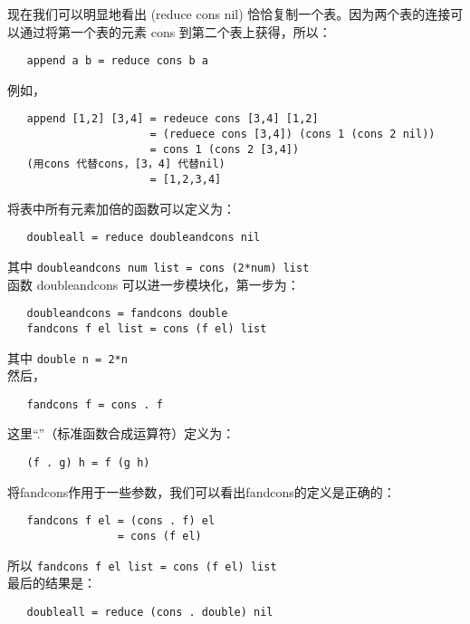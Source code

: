 \documentclass[12pt]{article}
\begin{document}
现在我们可以明显地看出 (reduce cons nil) 恰恰复制一个表。因为两个表的连接可以通过将第一个表的元素 cons 到第二个表上获得，所以：

\begin{verbatim}
   append a b = reduce cons b a
\end{verbatim}

例如，
\begin{verbatim}
   append [1,2] [3,4] = redeuce cons [3,4] [1,2]
                      = (reduece cons [3,4]) (cons 1 (cons 2 nil))
                      = cons 1 (cons 2 [3,4])
   (用cons 代替cons，[3，4] 代替nil)
                      = [1,2,3,4]
\end{verbatim}

将表中所有元素加倍的函数可以定义为：

\begin{verbatim}
   doubleall = reduce doubleandcons nil
\end{verbatim}

其中 \verb"doubleandcons num list = cons (2*num) list"\\

函数 doubleandcons 可以进一步模块化，第一步为：

\begin{verbatim}
   doubleandcons = fandcons double
   fandcons f el list = cons (f el) list
\end{verbatim}

其中 \verb"double n = 2*n"\\

然后，
 
\begin{verbatim}
   fandcons f = cons . f
\end{verbatim}
  
这里``.''（标准函数合成运算符）定义为：

\begin{verbatim}
   (f . g) h = f (g h)
\end{verbatim}

将fandcons作用于一些参数，我们可以看出fandcons的定义是正确的：

\begin{verbatim}
   fandcons f el = (cons . f) el
                 = cons (f el)
\end{verbatim}

所以 \verb"fandcons f el list = cons (f el) list"\\

最后的结果是：

\begin{verbatim}
   doubleall = reduce (cons . double) nil
\end{verbatim}
\end{document}
